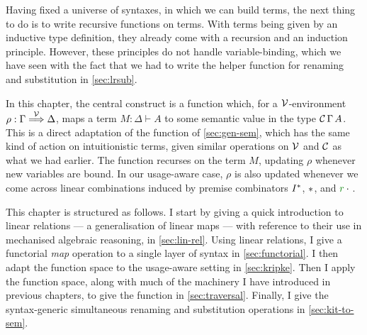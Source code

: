 Having fixed a universe of syntaxes, in which we can build terms, the next thing
to do is to write recursive functions on terms.
With terms being given by an inductive  type definition, they
already come with a recursion and an induction principle.
However, these principles do not handle variable-binding, which we have seen
with the fact that we had to write the  helper
function for renaming and substitution in \cref{sec:lrsub}.

In this chapter, the central construct is a function 
which, for a $\mathcal V$-environment $\rho : \Gamma \stackrel{\mathcal V}\Longrightarrow \Delta$,
maps a term $M : \Delta \vdash A$ to some semantic value in the type
$\mathcal C\,\Gamma\,A$.
This is a direct adaptation of the  function of
\cref{sec:gen-sem}, which has the same kind of action on intuitionistic terms,
given similar operations on $\mathcal V$ and $\mathcal C$ as what we had earlier.
The  function recurses on the term $M$, updating $\rho$
whenever new variables are bound.
In our usage-aware case, $\rho$ is also updated whenever we come across linear
combinations induced by premise combinators $I^{\mathbin{*}}$, $\mathbin{*}$, and
$\gr r \cdot {}$.

This chapter is structured as follows.
I start by giving a quick introduction to linear relations --- a generalisation
of linear maps --- with reference to their use in mechanised algebraic
reasoning, in \cref{sec:lin-rel}.
Using linear relations, I give a functorial \emph{map} operation to a single
layer of syntax in \cref{sec:functorial}.
I then adapt the  function space to the usage-aware
setting in \cref{sec:kripke}.
Then I apply the  function space, along with much of the
machinery I have introduced in previous chapters, to give the
 function in \cref{sec:traversal}.
Finally, I give the syntax-generic simultaneous renaming and substitution
operations in \cref{sec:kit-to-sem}.




